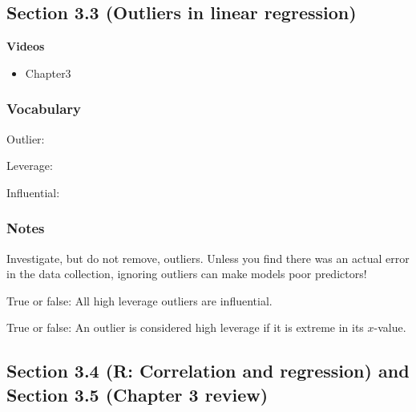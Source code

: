 \documentclass[
]{report}
\providecommand{\tightlist}{%
  \setlength{\itemsep}{0pt}\setlength{\parskip}{0pt}}
\newcommand{\rgs}{\vspace{12pt}} %
\begin{document}
\hypertarget{section-3.3-outliers-in-linear-regression}{%
\subsection*{Section 3.3 (Outliers in linear regression)}\label{section-3.3-outliers-in-linear-regression}}


\textbf{Videos}

\begin{itemize}
\tightlist
\item
  Chapter3
\end{itemize}


\hypertarget{vocabulary-7}{%
\subsubsection*{Vocabulary}\label{vocabulary-7}}

Outlier:
\rgs

Leverage:
\rgs

Influential:
\rgs

\hypertarget{notes-9}{%
\subsubsection*{Notes}\label{notes-9}}

Investigate, but do not remove, outliers. Unless you find there was an actual error in the data collection, ignoring outliers can make models poor predictors!

True or false: All high leverage outliers are influential.

True or false: An outlier is considered high leverage if it is extreme in its \(x\)-value.

\hypertarget{section-3.4-r-correlation-and-regression-and-section-3.5-chapter-3-review}{%
\subsection*{Section 3.4 (R: Correlation and regression) and Section 3.5 (Chapter 3 review)}\label{section-3.4-r-correlation-and-regression-and-section-3.5-chapter-3-review}}
\end{document}
